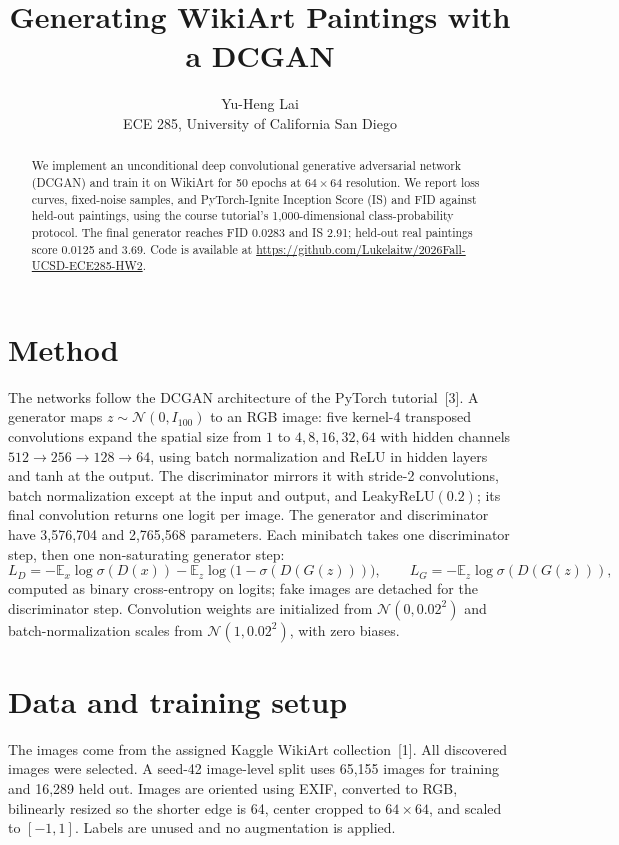 \documentclass{article}
\title{Generating WikiArt Paintings with a DCGAN}
\author{Yu-Heng Lai \\ ECE 285, University of California San Diego}
\begin{document}
\maketitle
\begin{abstract}
We implement an unconditional deep convolutional generative adversarial network (DCGAN)
and train it on WikiArt for 50 epochs at $64\times64$ resolution.
We report loss curves, fixed-noise samples, and PyTorch-Ignite Inception Score (IS)
and FID against held-out paintings, using the course tutorial's 1,000-dimensional
class-probability protocol. The final generator reaches FID 0.0283 and IS 2.91;
held-out real paintings score 0.0125 and 3.69.
Code is available at \url{https://github.com/Lukelaitw/2026Fall-UCSD-ECE285-HW2}.
\end{abstract}

\section{Method}
The networks follow the DCGAN architecture of the PyTorch tutorial~[3].
A generator maps $z\sim\mathcal{N}(0,I_{100})$ to an RGB image:
five kernel-4 transposed convolutions expand the spatial size from $1$ to
$4,8,16,32,64$ with hidden channels $512\!\to\!256\!\to\!128\!\to\!64$, using batch normalization and ReLU
in hidden layers and tanh at the output.
The discriminator mirrors it with stride-2 convolutions, batch normalization except at
the input and output, and LeakyReLU$(0.2)$; its final convolution returns one logit per image.
The generator and discriminator have 3,576,704 and 2,765,568 parameters.
Each minibatch takes one discriminator step, then one non-saturating generator step:
\[
L_D=-\mathbb{E}_{x}\log\sigma(D(x))-\mathbb{E}_{z}\log\bigl(1-\sigma(D(G(z)))\bigr),\qquad
L_G=-\mathbb{E}_{z}\log\sigma(D(G(z))),
\]
computed as binary cross-entropy on logits; fake images are detached for the discriminator step.
Convolution weights are initialized from $\mathcal{N}(0,0.02^2)$ and
batch-normalization scales from $\mathcal{N}(1,0.02^2)$, with zero biases.

\section{Data and training setup}
The images come from the assigned Kaggle WikiArt collection~[1]. All discovered images were selected.
A seed-42 image-level split uses 65,155 images for training and 16,289 held out.
Images are oriented using EXIF, converted to RGB, bilinearly resized so the
shorter edge is 64, center cropped to $64\times64$, and scaled to $[-1,1]$.
Labels are unused and no augmentation is applied.
\end{document}
